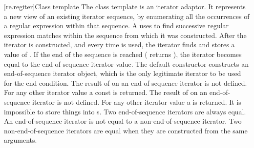 [re.regiter]{Class template }
\pnum
{}%
%
The class template  is an iterator adaptor.
It represents a new view of an existing iterator sequence, by
enumerating all the occurrences of a regular expression within that
sequence. A  uses   to find successive
regular expression matches within the sequence from which it was
constructed.  After the iterator is constructed, and every time  is
used, the iterator finds and stores a value of
. If the end of the sequence is
reached ( returns ), the iterator becomes equal to
the end-of-sequence iterator value. The default constructor
constructs an end-of-sequence iterator object,
which is the only legitimate iterator to be used for the end
condition. The result of  on an end-of-sequence iterator is not
defined. For any other iterator value a const
 is returned. The result of
 on an end-of-sequence iterator is not defined. For any other
iterator value a  is
returned. It is impossible to store things into s. Two
end-of-sequence iterators are always equal. An end-of-sequence
iterator is not equal to a non-end-of-sequence iterator. Two
non-end-of-sequence iterators are equal when they are constructed from
the same arguments.

